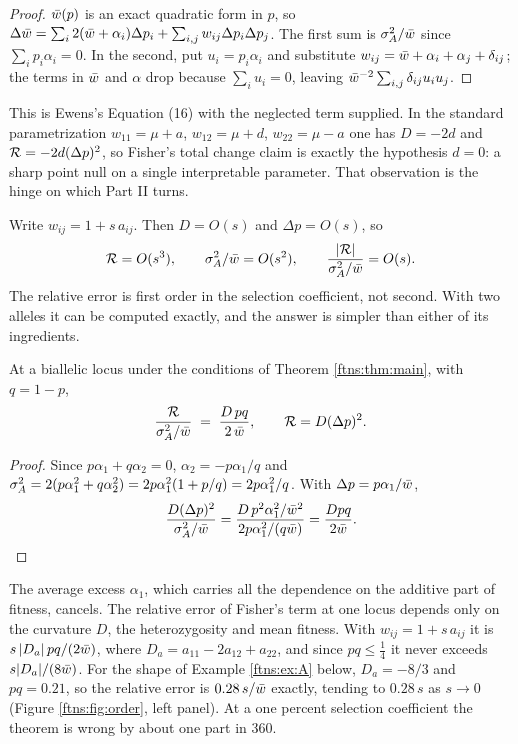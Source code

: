 \begin{proof}
$\bar{w}(p)$ is an exact quadratic form in $p$, so
$\Delta\bar{w}=\sum_i2(\bar{w}+\alpha_i)\Delta p_i+\sum_{i,j}w_{ij}\Delta p_i\Delta p_j$. The first sum
is $\sigma^{2}_{A}/\bar{w}$ since $\sum_ip_i\alpha_i=0$. In the second, put $u_i=p_i\alpha_i$ and substitute
$w_{ij}=\bar{w}+\alpha_i+\alpha_j+\delta_{ij}$; the terms in $\bar{w}$ and $\alpha$ drop because
$\sum_iu_i=0$, leaving $\bar{w}^{-2}\sum_{i,j}\delta_{ij}u_iu_j$.
\end{proof}

This is Ewens's Equation (16) with the neglected term supplied. In the standard parametrization
$w_{11}=\mu+a$, $w_{12}=\mu+d$, $w_{22}=\mu-a$ one has $D=-2d$ and $\mathcal{R}=-2d(\Delta p)^2$, so
Fisher's total change claim is exactly the hypothesis $d=0$: a sharp point null on a single
interpretable parameter. That observation is the hinge on which Part II turns.

Write $w_{ij}=1+s\,a_{ij}$. Then $D=O(s)$ and $\Delta p=O(s)$, so
\begin{equation}
\mathcal{R}=O(s^3), \qquad \sigma^{2}_{A}/\bar{w}=O(s^2), \qquad
\frac{|\mathcal{R}|}{\sigma^{2}_{A}/\bar{w}}=O(s) .
\label{ftns:eq:order}
\end{equation}
The relative error is first order in the selection coefficient, not second. With two alleles it
can be computed exactly, and the answer is simpler than either of its ingredients.

\begin{corollary}
\label{ftns:cor:relerr}
At a biallelic locus under the conditions of Theorem \ref{ftns:thm:main}, with $q=1-p$,
\[
\frac{\mathcal{R}}{\sigma^{2}_{A}/\bar{w}}\;=\;\frac{D\,pq}{2\,\bar{w}} ,
\qquad \mathcal{R}=D(\Delta p)^2 .
\]
\end{corollary}

\begin{proof}
Since $p\alpha_1+q\alpha_2=0$, $\alpha_2=-p\alpha_1/q$ and
$\sigma^{2}_{A}=2(p\alpha_1^2+q\alpha_2^2)=2p\alpha_1^2(1+p/q)=2p\alpha_1^2/q$. With
$\Delta p=p\alpha_1/\bar{w}$,
\[
\frac{D(\Delta p)^2}{\sigma^{2}_{A}/\bar{w}}=\frac{D\,p^2\alpha_1^2/\bar{w}^2}{2p\alpha_1^2/(q\bar{w})}
=\frac{Dpq}{2\bar{w}}.\qedhere
\]
\end{proof}

The average excess $\alpha_1$, which carries all the dependence on the additive part of fitness,
cancels. The relative error of Fisher's term at one locus depends only on the curvature $D$, the
heterozygosity and mean fitness. With $w_{ij}=1+s\,a_{ij}$ it is $s\,|D_a|\,pq/(2\bar{w})$, where
$D_a=a_{11}-2a_{12}+a_{22}$, and since $pq\le\tfrac14$ it never exceeds $s|D_a|/(8\bar{w})$. For the
shape of Example \ref{ftns:ex:A} below, $D_a=-8/3$ and $pq=0.21$, so the relative error is
$0.28\,s/\bar{w}$ exactly, tending to $0.28\,s$ as $s\to0$ (Figure \ref{ftns:fig:order}, left panel).
At a one percent selection coefficient the theorem is wrong by about one part in $360$.

